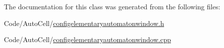 The documentation for this class was generated from the following files\+:\begin{DoxyCompactItemize}
\item 
Code/\+Auto\+Cell/\mbox{\hyperlink{configelementaryautomatonwindow_8h}{configelementaryautomatonwindow.\+h}}\item 
Code/\+Auto\+Cell/\mbox{\hyperlink{configelementaryautomatonwindow_8cpp}{configelementaryautomatonwindow.\+cpp}}\end{DoxyCompactItemize}
